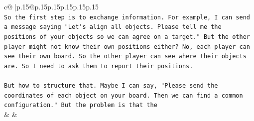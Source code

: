 \documentclass{article}
\begin{document}
{\begin{supertabular}{c@{$\;$}|p{.15\linewidth}@{}p{.15\linewidth}p{.15\linewidth}p{.15\linewidth}p{.15\linewidth}p{.15\linewidth}}
{{{\\ 
\texttt{So the first step is to exchange information. For example, I can send a message saying "Let's align all objects. Please tell me the positions of your objects so we can agree on a target." But the other player might not know their own positions either? No, each player can see their own board. So the other player can see where their objects are. So I need to ask them to report their positions.} \\
\\ 
\texttt{But how to structure that. Maybe I can say, "Please send the coordinates of each object on your board. Then we can find a common configuration." But the problem is that the} \\
            }
        }
    }
    & & \\ \\


\end{supertabular}}
\end{document}
